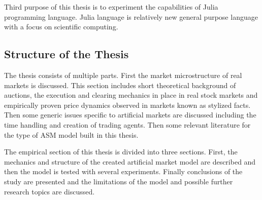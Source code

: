 Third purpose of this thesis is to experiment the capabilities of Julia programming language.
Julia language is relatively new general purpose language with a focus on scientific computing.


\subsection{Structure of the Thesis}
The thesis consists of multiple parts. First the market microstructure of real markets is discussed. 
This section includes short theoretical background of auctions, the execution and clearing mechanics in place in real
stock markets and empirically proven price dynamics observed in markets known as stylized
facts. Then some generic issues specific to artificial markets are discussed including the time handling and creation
of trading agents. Then some relevant literature for the type of ASM model built in this thesis.

The empirical section of this thesis is divided into three sections. First, the mechanics and
structure of the created artificial market model are described and then the model is tested
with several experiments. Finally conclusions of the study are presented and the limitations of the model and
possible further research topics are discussed.